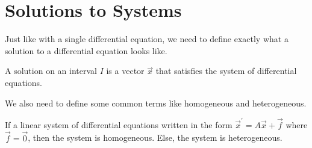 \section{Solutions to Systems}
\noindent
Just like with a single differential equation, we need to define exactly what a solution to a differential equation looks like.
\begin{definition}
	A solution on an interval $I$ is a vector $\vec{x}$ that satisfies the system of differential equations.
\end{definition}

\noindent
We also need to define some common terms like homogeneous and heterogeneous.
\begin{definition}
	If a linear system of differential equations written in the form $\vec{x}^\prime = A\vec{x} + \vec{f}$ where $\vec{f} = \vec{0}$, then the system is homogeneous. Else, the system is heterogeneous.
\end{definition}

\ifodd{}\fi